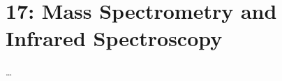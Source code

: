 \chapter{17: Mass Spectrometry and Infrared Spectroscopy}\label{17: Mass Spectrometry and Infrared Spectroscopy}
\begin{adjustwidth}{1cm}{1cm}
  \dots
\end{adjustwidth}


